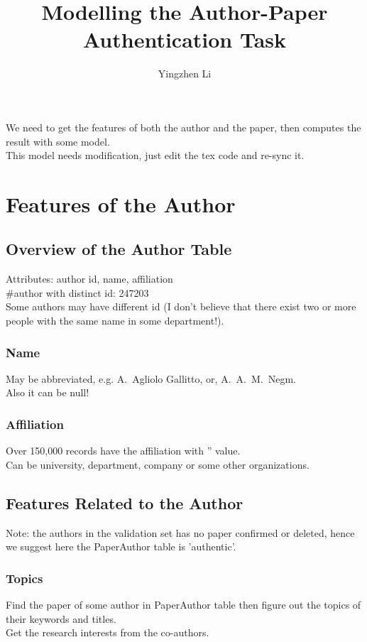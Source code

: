 \documentclass[12pt,a4paper]{article}
\author{Yingzhen Li}
\title{Modelling the Author-Paper Authentication Task}
\begin{document}
\maketitle

We need to get the features of both the author and the paper, then computes the result with some model.\\
This model needs modification, just edit the tex code and re-sync it.

\section{Features of the Author}
\subsection{Overview of the Author Table}
Attributes: author id, name, affiliation\\
\#author with distinct id: 247203\\
Some authors may have different id (I don't believe that there exist two or more people with the same name in some department!).

\subsubsection{Name}
May be abbreviated, e.g.  A.\ Agliolo Gallitto, or, A.\ A.\ M.\ Negm. \\
Also it can be null!

\subsubsection{Affiliation}
Over 150,000 records have the affiliation with '' value.\\
Can be university, department, company or some other organizations.

\subsection{Features Related to the Author}
Note: the authors in the validation set has no paper confirmed or deleted, hence we suggest here the PaperAuthor table is 'authentic'.

\subsubsection{Topics}
Find the paper of some author in PaperAuthor table then figure out the topics of their keywords and titles.\\
Get the research interests from the co-authors.
\end{document}
